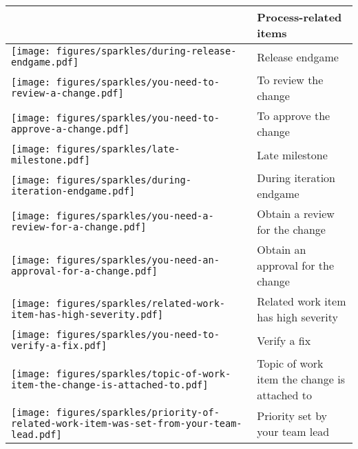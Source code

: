 \addtocounter{table}{1}
\begin{table}[t!]
\centering
\begin{tabular}{ll}
\toprule
\vspace{-2pt}& Process-related items\\
\midrule
\vspace{-2pt}\texttt{[image: figures/sparkles/during-release-endgame.pdf]} & Release endgame\\
\vspace{-2pt}\texttt{[image: figures/sparkles/you-need-to-review-a-change.pdf]} & To review the change\\
\vspace{-2pt}\texttt{[image: figures/sparkles/you-need-to-approve-a-change.pdf]} & To approve the change\\
\vspace{-2pt}\texttt{[image: figures/sparkles/late-milestone.pdf]} & Late milestone\\
\vspace{-2pt}\texttt{[image: figures/sparkles/during-iteration-endgame.pdf]} & During iteration endgame\\
\vspace{-2pt}\texttt{[image: figures/sparkles/you-need-a-review-for-a-change.pdf]} & Obtain a review for the change\\
\vspace{-2pt}\texttt{[image: figures/sparkles/you-need-an-approval-for-a-change.pdf]} & Obtain an approval for the change\\
\vspace{-2pt}\texttt{[image: figures/sparkles/related-work-item-has-high-severity.pdf]} & Related work item has high severity\\
\vspace{-2pt}\texttt{[image: figures/sparkles/you-need-to-verify-a-fix.pdf]} & Verify a fix\\
\vspace{-2pt}\texttt{[image: figures/sparkles/topic-of-work-item-the-change-is-attached-to.pdf]} & Topic of work item the change is attached to\\ 
\vspace{-2pt}\texttt{[image: figures/sparkles/priority-of-related-work-item-was-set-from-your-team-lead.pdf]} & Priority set by your team lead\\

\end{tabular}
\end{table}
